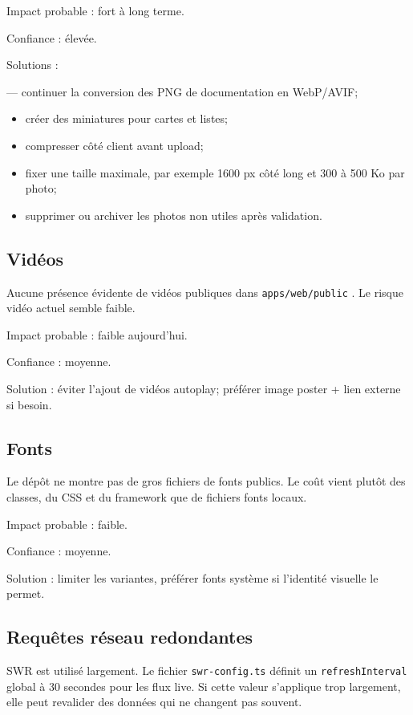 \documentclass[
  10pt,
  a4paper,
  DIV=11,
  numbers=noendperiod,
  oneside]{scrreprt}
\begin{document}
Impact probable : fort à long terme.

Confiance : élevée.

Solutions :

--- continuer la conversion des PNG de documentation en WebP/AVIF;

\begin{itemize}
\item
  créer des miniatures pour cartes et listes;
\item
  compresser côté client avant upload;
\item
  fixer une taille maximale, par exemple 1600 px côté long et 300 à 500
  Ko par photo;
\item
  supprimer ou archiver les photos non utiles après validation.
\end{itemize}

\subsection{Vidéos}\label{viduxe9os}

Aucune présence évidente de vidéos publiques dans
\texttt{apps/web/public} . Le risque vidéo actuel semble faible.

Impact probable : faible aujourd'hui.

Confiance : moyenne.

Solution : éviter l'ajout de vidéos autoplay; préférer image poster +
lien externe si besoin.

\subsection{Fonts}\label{fonts}

Le dépôt ne montre pas de gros fichiers de fonts publics. Le coût vient
plutôt des classes, du CSS et du framework que de fichiers fonts locaux.

Impact probable : faible.

Confiance : moyenne.

Solution : limiter les variantes, préférer fonts système si l'identité
visuelle le permet.

\subsection{Requêtes réseau
redondantes}\label{requuxeates-ruxe9seau-redondantes}

SWR est utilisé largement. Le fichier \texttt{swr-config.ts} définit un
\texttt{refreshInterval} global à 30 secondes pour les flux live. Si
cette valeur s'applique trop largement, elle peut revalider des données
qui ne changent pas souvent.
\end{document}
